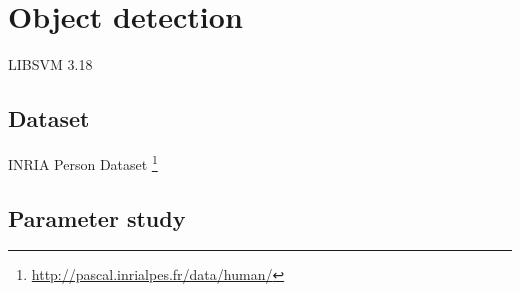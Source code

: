 \documentclass[thesis.tex]{subfiles}
\begin{document}
\chapter{Object detection}
\label{sec:od}

LIBSVM 3.18 \cite{chang2011library}

\section{Dataset}
\label{sec:odDataset}

INRIA Person Dataset \footnote{\url{http://pascal.inrialpes.fr/data/human/}} \cite{dalal2005histograms}

\section{Parameter study}
\label{sec:odParameterStudy}

\subbibliography
\end{document}
